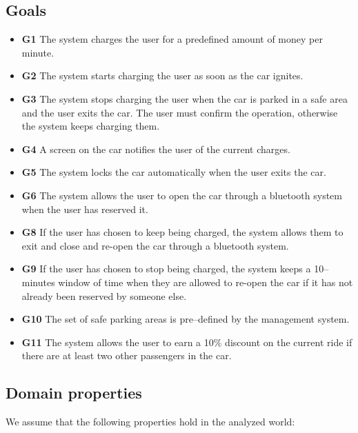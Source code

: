 \documentclass{article}
\begin{document}
		\subsection{Goals}
			\begin{itemize}

				\item \textbf{G1} The system charges the user for a predefined amount of money per minute.
				\item \textbf{G2} The system starts charging the user as soon as the car ignites.
				\item \textbf{G3} The system stops charging the user when the car is parked in a safe area and the user exits the car. The user must confirm the operation, otherwise the system keeps charging them. 
				\item \textbf{G4} A screen on the car notifies the user of the current charges.
				\item \textbf{G5} The system locks the car automatically when the user exits the car. 
				\item \textbf{G6} The system allows the user to open the car through a bluetooth system when the user has reserved it.
				\item \textbf{G8} If the user has chosen to keep being charged, the system allows them to exit and close and re-open the car through a bluetooth system.
				\item \textbf{G9} If the user has chosen to stop being charged, the system keeps a 10–minutes window of time when they are allowed to re-open the car if it has not already been reserved by someone else.
				\item \textbf{G10} The set of safe parking areas is pre–defined by the management system.
				\item \textbf{G11} The system allows the user to earn a 10\% discount on the current ride if there are at least two other passengers in the car.

			\end{itemize}

		\subsection{Domain properties}
			
			We assume that the following properties hold in the analyzed world:			
			
\end{document}
